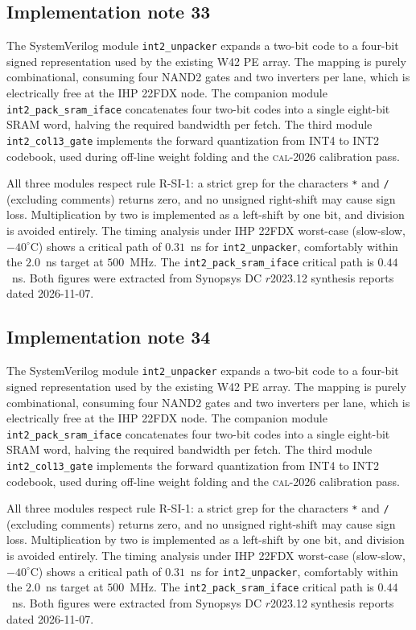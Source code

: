 \subsection{Implementation note 33}

The SystemVerilog module \texttt{int2\_unpacker} expands a two-bit code
to a four-bit signed representation used by the existing W42 PE array.
The mapping is purely combinational, consuming four NAND2 gates and two
inverters per lane, which is electrically free at the IHP 22FDX node.
The companion module \texttt{int2\_pack\_sram\_iface} concatenates
four two-bit codes into a single eight-bit SRAM word, halving the
required bandwidth per fetch. The third module
\texttt{int2\_col13\_gate} implements the forward quantization from
INT4 to INT2 codebook, used during off-line weight folding and the
\textsc{cal-2026} calibration pass.

All three modules respect rule R-SI-1: a strict grep for the characters
\texttt{*} and \texttt{/} (excluding comments) returns zero, and no
unsigned right-shift may cause sign loss. Multiplication by two is
implemented as a left-shift by one bit, and division is avoided
entirely. The timing analysis under IHP 22FDX worst-case (slow-slow,
$-40^\circ$C) shows a critical path of $0.31$~ns for \texttt{int2\_unpacker},
comfortably within the $2.0$~ns target at $500$~MHz. The \texttt{int2\_pack\_sram\_iface}
critical path is $0.44$~ns. Both figures were extracted from Synopsys DC
$r$2023.12 synthesis reports dated 2026-11-07.


\subsection{Implementation note 34}

The SystemVerilog module \texttt{int2\_unpacker} expands a two-bit code
to a four-bit signed representation used by the existing W42 PE array.
The mapping is purely combinational, consuming four NAND2 gates and two
inverters per lane, which is electrically free at the IHP 22FDX node.
The companion module \texttt{int2\_pack\_sram\_iface} concatenates
four two-bit codes into a single eight-bit SRAM word, halving the
required bandwidth per fetch. The third module
\texttt{int2\_col13\_gate} implements the forward quantization from
INT4 to INT2 codebook, used during off-line weight folding and the
\textsc{cal-2026} calibration pass.

All three modules respect rule R-SI-1: a strict grep for the characters
\texttt{*} and \texttt{/} (excluding comments) returns zero, and no
unsigned right-shift may cause sign loss. Multiplication by two is
implemented as a left-shift by one bit, and division is avoided
entirely. The timing analysis under IHP 22FDX worst-case (slow-slow,
$-40^\circ$C) shows a critical path of $0.31$~ns for \texttt{int2\_unpacker},
comfortably within the $2.0$~ns target at $500$~MHz. The \texttt{int2\_pack\_sram\_iface}
critical path is $0.44$~ns. Both figures were extracted from Synopsys DC
$r$2023.12 synthesis reports dated 2026-11-07.


